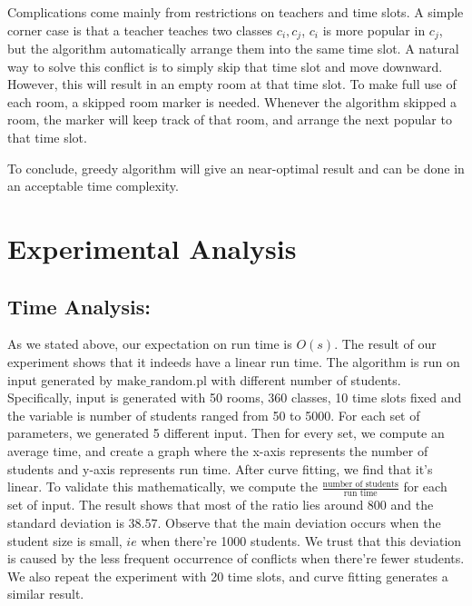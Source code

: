 \documentclass[11pt, oneside]{article}   	%
\begin{document}
\par Complications come mainly from restrictions on teachers and time slots. A simple corner case is that a teacher teaches two classes $c_i,c_j$, $c_i$ is more popular in $c_j$, but the algorithm automatically arrange them into the same time slot. A natural way to solve this conflict is to simply skip that time slot and move downward. However, this will result in an empty room at that time slot. To make full use of each room, a skipped room marker is needed. Whenever the algorithm skipped a room, the marker will keep track of that room, and arrange the next popular to that time slot.
\par To conclude, greedy algorithm will give an near-optimal result and can be done in an acceptable time complexity.
 
 \section{Experimental Analysis}
 \subsection{Time Analysis:}
As we stated above, our expectation on run time is $O(s)$. The result of our experiment shows that it indeeds have a linear run time. The algorithm is run on input generated by $\text{make\_random.pl}$ with different number of students. Specifically, input is generated with 50 rooms, 360 classes, 10 time 
slots fixed and the variable is number of students ranged from 50 to 5000. For each set of parameters, we generated 5 different input. Then for every set, we compute an average time, and create a graph where the x-axis represents the number of students and y-axis represents run time. After curve fitting, we find that it's linear. To validate this mathematically, we compute the $\frac{\text{number of students}}{\text{run time}}$ for each set of input. The result shows that most of the ratio lies around $800$ and the standard deviation is $38.57$. Observe that the main deviation occurs when the student size is small, $ie$ when there're 1000 students. We trust that this deviation is caused by the less frequent occurrence  of conflicts when there're fewer students. We also repeat the experiment with 20 time slots, and curve fitting generates a similar result.
\end{document}
